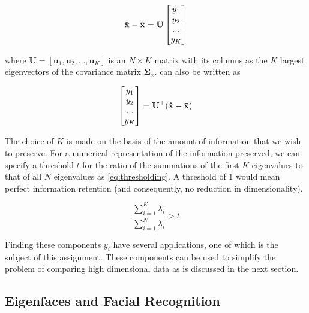 \documentclass[headings=optiontoheadandtoc,listof=totoc,parskip=full]{scrartcl}
\begin{document}
\begin{equation}\label{eq:linear_transform_1}
    \mathbf{\hat{x}} - \mathbf{\Bar{x}} = \mathbf{U}\begin{bmatrix}y_1\\y_2\\...\\y_K\end{bmatrix}
\end{equation}

where $\mathbf{U} = [\mathbf{u}_1, \mathbf{u}_2, ... , \mathbf{u}_K]$ is an $N \times K$ matrix with its columns as the $K$ largest eigenvectors of the covariance matrix $\mathbf{\Sigma}_x$.  can also be written as 

\begin{equation}\label{eq:linear_transform_2}
    \begin{bmatrix}y_1\\y_2\\...\\y_K\end{bmatrix} = \mathbf{U}^\top(\mathbf{\hat{x}} - \mathbf{\Bar{x}})
\end{equation}

The choice of $K$ is made on the basis of the amount of information that we wish to preserve. For a numerical representation of the information preserved, we can specify a threshold $t$ for the ratio of the summations of the first $K$ eigenvalues to that of all $N$ eigenvalues as \cref{eq:thresholding}. A threshold of 1 would mean perfect information retention (and consequently, no reduction in dimensionality).

\begin{equation}\label{eq:thresholding}
    \frac{\sum_{i = 1}^K\lambda_i}{\sum_{i = 1}^N\lambda_i} > t
\end{equation}

Finding these components $y_i$ have several applications, one of which is the subject of this assignment. These components can be used to simplify the problem of comparing high dimensional data as is discussed in the next section.

\subsection{Eigenfaces and Facial Recognition}
\label{sec:theory-eigenfaces}
\end{document}
